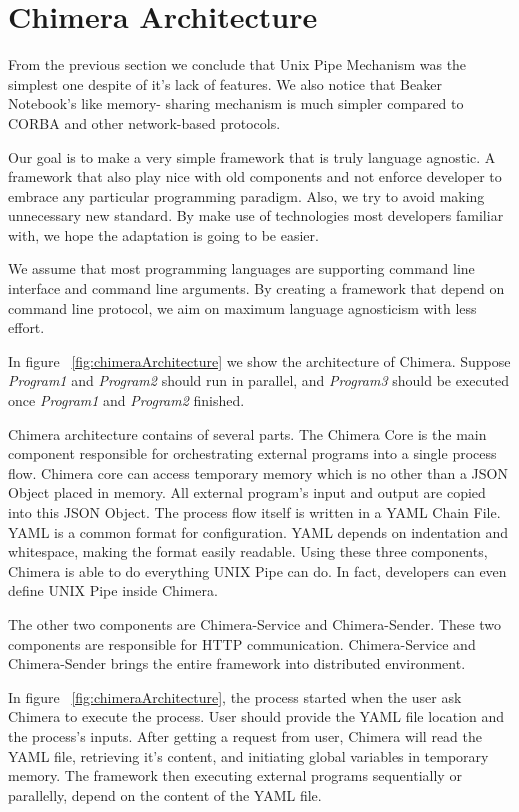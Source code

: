\documentclass[conference]{IEEEtran}
\begin{document}
\section{Chimera Architecture}

From the previous section we conclude that Unix Pipe Mechanism was the simplest one
despite of it's lack of features. We also notice that Beaker Notebook's like memory-
sharing mechanism is much simpler compared to CORBA and other network-based protocols.

Our goal is to make a very simple framework that is truly language agnostic. A framework
that also play nice with old components and not enforce developer to embrace any 
particular programming paradigm. Also, we try to avoid making unnecessary new standard.
By make use of technologies most developers familiar with, we hope the adaptation is
going to be easier.

We assume that most programming languages are supporting command line interface and
command line arguments. By creating a framework that depend on command line protocol,
we aim on maximum language agnosticism with less effort.

In figure ~\ref{fig:chimeraArchitecture} we show the architecture of Chimera. Suppose
{\it Program1} and {\it Program2} should run in parallel, and {\it Program3} should be
executed once {\it Program1} and {\it Program2} finished.

Chimera architecture contains of several parts. The Chimera Core is the main component 
responsible for orchestrating external programs into a single process flow. 
Chimera core can access temporary memory which is no other than a JSON Object placed in
memory. All external program's input and output are copied into this JSON Object.
The process flow itself is written in a YAML Chain File. YAML is a common format for
configuration. YAML depends on indentation and whitespace, making the format easily 
readable. Using these three components, Chimera is able to do everything UNIX Pipe can do. 
In fact, developers can even define UNIX Pipe inside Chimera.

The other two components are Chimera-Service and Chimera-Sender. These two components
are responsible for HTTP communication. Chimera-Service and Chimera-Sender brings the 
entire framework into distributed environment.

In figure ~\ref{fig:chimeraArchitecture}, the process started when the user ask Chimera 
to execute the process. User should provide the YAML file location and the process's
inputs. After getting a request from user, Chimera will read the YAML file, retrieving
it's content, and initiating global variables in temporary memory. The framework then
executing external programs sequentially or parallelly, depend on the content of the
YAML file.
\end{document}
